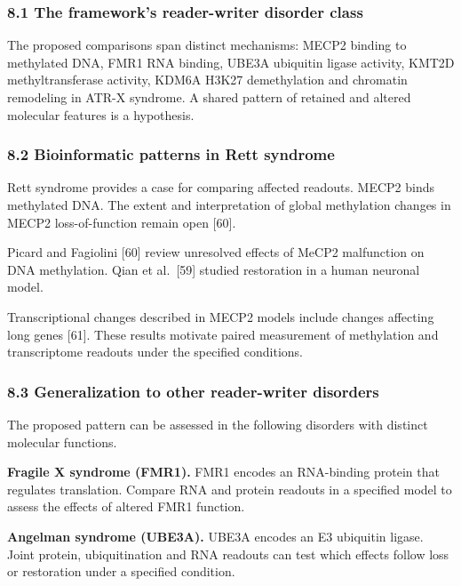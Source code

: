 \documentclass[
]{article}
\begin{document}
\hypertarget{the-frameworks-reader-writer-disorder-class}{%
\subsubsection{8.1 The framework's reader-writer disorder
class}\label{the-frameworks-reader-writer-disorder-class}}

The proposed comparisons span distinct mechanisms: MECP2 binding to
methylated DNA, FMR1 RNA binding, UBE3A ubiquitin ligase activity, KMT2D
methyltransferase activity, KDM6A H3K27 demethylation and chromatin
remodeling in ATR-X syndrome. A shared pattern of retained and altered
molecular features is a hypothesis.

\hypertarget{bioinformatic-patterns-in-rett-syndrome}{%
\subsubsection{8.2 Bioinformatic patterns in Rett
syndrome}\label{bioinformatic-patterns-in-rett-syndrome}}

Rett syndrome provides a case for comparing affected readouts. MECP2
binds methylated DNA. The extent and interpretation of global
methylation changes in MECP2 loss-of-function remain open {[}60{]}.

Picard and Fagiolini {[}60{]} review unresolved effects of MeCP2
malfunction on DNA methylation. Qian et al.~{[}59{]} studied restoration
in a human neuronal model.

Transcriptional changes described in MECP2 models include changes
affecting long genes {[}61{]}. These results motivate paired measurement
of methylation and transcriptome readouts under the specified
conditions.

\hypertarget{generalization-to-other-reader-writer-disorders}{%
\subsubsection{8.3 Generalization to other reader-writer
disorders}\label{generalization-to-other-reader-writer-disorders}}

The proposed pattern can be assessed in the following disorders with
distinct molecular functions.

\textbf{Fragile X syndrome (FMR1).} FMR1 encodes an RNA-binding protein
that regulates translation. Compare RNA and protein readouts in a
specified model to assess the effects of altered FMR1 function.

\textbf{Angelman syndrome (UBE3A).} UBE3A encodes an E3 ubiquitin
ligase. Joint protein, ubiquitination and RNA readouts can test which
effects follow loss or restoration under a specified condition.
\end{document}

